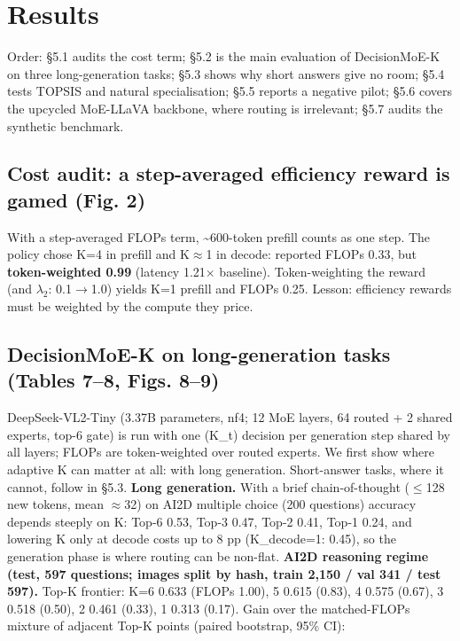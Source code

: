 \section{Results}\label{results}

Order: §5.1 audits the cost term; §5.2 is the main evaluation of DecisionMoE-K on three long-generation tasks; §5.3 shows why short answers give no room; §5.4 tests TOPSIS and natural specialisation; §5.5 reports a negative pilot; §5.6 covers the upcycled MoE-LLaVA backbone, where routing is irrelevant; §5.7 audits the synthetic benchmark.

\subsection{Cost audit: a step-averaged efficiency reward is gamed (Fig. 2)}\label{cost-audit-a-step-averaged-efficiency-reward-is-gamed-fig.-2}

With a step-averaged FLOPs term, \textasciitilde600-token prefill counts as one step. The policy chose K=4 in prefill and K$\approx$1 in decode:
reported FLOPs 0.33, but \textbf{token-weighted 0.99} (latency 1.21$\times$ baseline). Token-weighting the reward (and $\lambda_2$: 0.1$\rightarrow$1.0)
yields K=1 prefill and FLOPs 0.25. Lesson: efficiency rewards must be weighted by the compute they price.

\subsection{DecisionMoE-K on long-generation tasks (Tables 7--8, Figs. 8--9)}\label{decisionmoe-k-on-long-generation-tasks-tables-78-figs.-89}

DeepSeek-VL2-Tiny (3.37B parameters, nf4; 12 MoE layers, 64 routed + 2 shared experts, top-6 gate) is run with one (K\_t) decision per generation step shared by all layers; FLOPs are token-weighted over routed experts.
We first show where adaptive K can matter at all: with long generation. Short-answer tasks, where it cannot, follow in §5.3.
\textbf{Long generation.} With a brief chain-of-thought ($\leq$128 new tokens, mean $\approx$32) on AI2D multiple choice (200 questions) accuracy depends steeply on K: Top-6 0.53, Top-3 0.47, Top-2 0.41, Top-1 0.24, and lowering K only at decode costs up to 8 pp (K\_decode=1: 0.45), so the generation phase is where routing can be non-flat.
\textbf{AI2D reasoning regime (test, 597 questions; images split by hash, train 2,150 / val 341 / test 597).} Top-K frontier: K=6 0.633 (FLOPs 1.00), 5 0.615 (0.83), 4 0.575 (0.67), 3 0.518 (0.50), 2 0.461 (0.33), 1 0.313 (0.17). Gain over the matched-FLOPs mixture of adjacent Top-K points (paired bootstrap, 95\% CI):

